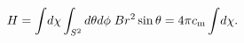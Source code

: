 \begin{equation}
H= \int\! d \chi \int_{S^2} d\theta  d\phi\; B r^2 \sin\theta
= 4\pi c_{\rm m} \int\! d\chi.
\end{equation}

